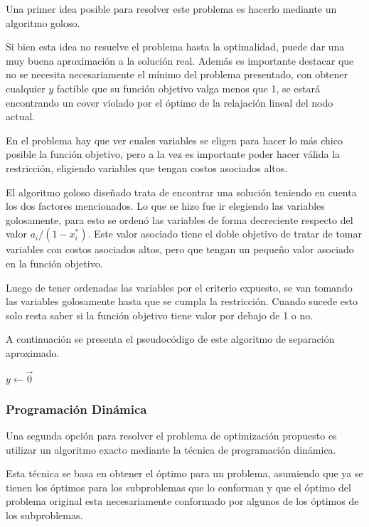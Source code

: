 Una primer idea posible para resolver este problema es hacerlo mediante un algoritmo goloso.

Si bien esta idea no resuelve el problema hasta la optimalidad, puede dar una muy buena aproximaci\'on a la soluci\'on real. Adem\'as es importante destacar que no se necesita necesariamente el m\'inimo del problema presentado, con obtener cualquier $y$ factible que su funci\'on objetivo valga menos que 1, se estar\'a encontrando un cover violado por el \'optimo de la relajaci\'on lineal del nodo actual.


En el problema hay que ver cuales variables se eligen para hacer lo m\'as chico posible la funci\'on objetivo, pero a la vez es importante poder hacer v\'alida la restricci\'on, eligiendo variables que tengan costos asociados altos.

El algoritmo goloso dise\~nado trata de encontrar una soluci\'on teniendo en cuenta los dos factores mencionados. Lo que se hizo fue ir elegiendo las variables golosamente, para esto se orden\'o las variables de forma decreciente respecto del valor $a_i / (1-x_i^*)$. Este valor asociado tiene el doble objetivo de tratar de tomar variables con costos asociados altos, pero que tengan un peque\~no valor asociado en la funci\'on objetivo.

Luego de tener ordenadas las variables por el criterio expuesto, se van tomando las variables golosamente hasta que se cumpla la restricci\'on. Cuando sucede esto solo resta saber si la funci\'on objetivo tiene valor por debajo de 1 o no.


A continuaci\'on se presenta el pseudoc\'odigo de este algoritmo de separaci\'on aproximado.


\bigskip
\begin{algorithmic}
  \State $y \gets \overrightarrow 0$
\EndFunction
\end{algorithmic}



\medskip
\subsubsection{Programaci\'on Din\'amica}

Una segunda opci\'on para resolver el problema de optimizaci\'on propuesto es utilizar un algoritmo exacto mediante la t\'ecnica de programaci\'on din\'amica.

Esta t\'ecnica se basa en obtener el \'optimo para un problema, asumiendo que ya se tienen los \'optimos para los subproblemas que lo conforman y que el \'optimo del problema original esta necesariamente conformado por algunos de los \'optimos de los subproblemas.


